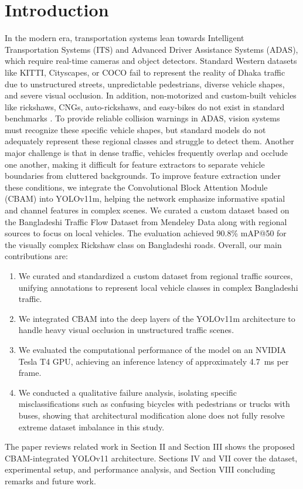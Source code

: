 \documentclass[conference]{IEEEtran}
\begin{document}
\section{Introduction}
In the modern era, transportation systems lean towards Intelligent Transportation Systems (ITS) and Advanced Driver Assistance Systems (ADAS), which require real-time cameras and object detectors. Standard Western datasets like KITTI\cite{1a}, Cityscapes\cite{2a}, or COCO\cite{3a} fail to represent the reality of Dhaka traffic due to unstructured streets, unpredictable pedestrians, diverse vehicle shapes, and severe visual occlusion. In addition, non-motorized and custom-built vehicles like rickshaws, CNGs, auto-rickshaws, and easy-bikes do not exist in standard benchmarks \cite{Hasan2021VehicleClassification}. To provide reliable collision warnings in ADAS, vision systems must recognize these specific vehicle shapes, but standard models do not adequately represent these regional classes and struggle to detect them. Another major challenge is that in dense traffic, vehicles frequently overlap and occlude one another, making it difficult for feature extractors to separate vehicle boundaries from cluttered backgrounds. To improve feature extraction under these conditions, we integrate the Convolutional Block Attention Module (CBAM)\cite{Woo2018CBAM} into YOLOv11m, helping the network emphasize informative spatial and channel features in complex scenes. We curated a custom dataset based on the Bangladeshi Traffic Flow Dataset from Mendeley Data\cite{Islam2025BangladeshiTrafficFlow} along with regional sources to focus on local vehicles. The evaluation achieved 90.8\% mAP@50 for the visually complex Rickshaw class on Bangladeshi roads.
Overall, our main contributions are:
\begin{enumerate}
    \item We curated and standardized a custom dataset from regional traffic sources, unifying annotations to represent local vehicle classes in complex Bangladeshi traffic.
    \item We integrated CBAM into the deep layers of the YOLOv11m architecture to handle heavy visual occlusion in unstructured traffic scenes.
    \item We evaluated the computational performance of the model on an NVIDIA Tesla T4 GPU, achieving an inference latency of approximately 4.7~ms per frame.
    \item We conducted a qualitative failure analysis, isolating specific misclassifications such as confusing bicycles with pedestrians or trucks with buses, showing that architectural modification alone does not fully resolve extreme dataset imbalance in this study.
\end{enumerate}
The paper reviews related work in Section II and Section III shows the proposed CBAM-integrated YOLOv11 architecture. Sections IV and VII cover the dataset, experimental setup, and performance analysis, and  Section VIII concluding remarks and future work.
\end{document}
